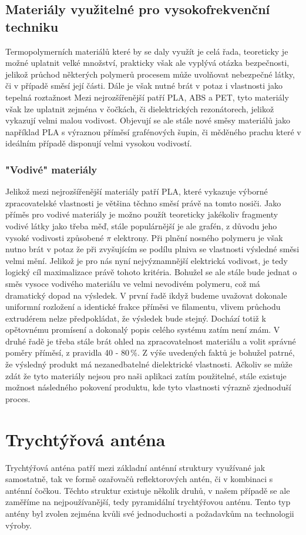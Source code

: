 \subsection{Materiály využitelné pro vysokofrekvenční techniku}
Termopolymerních materiálů které by se daly využít je celá řada, teoreticky je možné uplatnit velké množství, prakticky však ale vyplývá otázka bezpečnosti, jelikož průchod některých polymerů procesem může uvolňovat nebezpečné látky, či v případě směsí její části. Dále je však nutné brát v potaz i vlastnosti jako tepelná roztažnost 
Mezi nejrozšířenější patří PLA, ABS a PET, tyto materiály však lze uplatnit zejména v čočkách, či dielektrických rezonátorech, jelikož vykazují velmi malou vodivost. Objevují se ale stále nové směsy materiálů jako například PLA s výraznou příměsí grafénových šupin, či měděného prachu které v ideálním případě disponují velmi vysokou vodivostí.

\subsubsection{"Vodivé" materiály}
Jelikož mezi nejrozšířenější materiály patří PLA, které vykazuje výborné zpracovatelské vlastnosti je většina těchno směsí právě na tomto nosiči.
Jako příměs pro vodivé materiály je možno použít teoreticky jakékoliv fragmenty vodivé látky jako třeba měď, stále populárnější je ale grafén, z důvodu jeho vysoké vodivosti způsobené $\pi$ elektrony. Při plnění nosného polymeru je však nutno brát v potaz že při zvyšujícím se podílu plniva se vlastnosti výsledné směsi velmi mění.
Jelikož je pro nás nyní nejvýznamnější elektrická vodivost, je tedy logický cíl maximalizace právě tohoto kritéria. Bohužel se ale stále bude jednat o směs vysoce vodivého materiálu ve velmi nevodivém polymeru, což má dramatický dopad na výsledek. V první řadě ikdyž budeme uvažovat dokonale uniformní rozložení a identické frakce příměsi ve filamentu, vlivem průchodu extrudérem nelze předpokládat, že výsledek bude stejný. Dochází totiž k opětovnému promísení a dokonalý popis celého systému zatím není znám. V druhé řadě je třeba stále brát ohled na zpracovatelnost materiálu a volit správné poměry příměsí, z pravidla 40 - 80\,\%\cite{Dolecek}. Z výše uvedených faktů je bohužel patrné, že výsledný produkt má nezanedbatelné dielektrické vlastnosti.
Ačkoliv se může zdát že tyto materiály nejsou pro naši aplikaci zatím použitelné, stále existuje možnost následného pokovení produktu, kde tyto vlastnosti výrazně zjednoduší proces.

\section{Trychtýřová anténa}
Trychtýřová anténa patří mezi základní anténní struktury využívané jak samostatně, tak ve formě ozařovačů reflektorových antén, či v kombinaci s anténní čočkou. Těchto struktur existuje několik druhů, v našem případě se ale zaměříme na nejpoužívanější, tedy pyramidální trychtýřovou anténu.
Tento typ antény byl zvolen zejména kvůli své jednoduchosti a požadavkům na technologii výroby.

